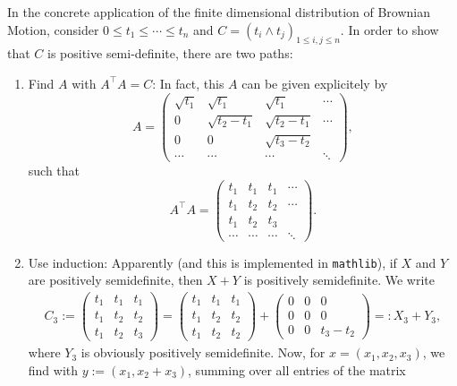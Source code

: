 \documentclass{article}
\theoremstyle{definition}
\theoremstyle{step} \newtheorem{step}{Step}
\newcommand{\leanline}[1]{\texttt{#1}}%
\begin{document}
In the concrete application of the finite dimensional distribution of
Brownian Motion, consider $0\leq t_1 \leq \cdots \leq t_n$ and $C =
(t_i \wedge t_j)_{1\leq i,j\leq n}$. In order to show that $C$ is
positive semi-definite, there are two paths:

\begin{enumerate}
\item Find $A$ with $A^\top A = C$: In fact, this $A$ can be given
  explicitely by
  $$ A = \left( \begin{matrix}\sqrt{t_1} & \sqrt{t_1} & \sqrt{t_1} &
    \cdots \\ 0 & \sqrt{t_2 - t_1} & \sqrt{t_2 - t_1} & \cdots \\ 0 &
    0 & \sqrt{t_3-t_2}\\ \cdots & \cdots & \cdots &
    \ddots \end{matrix}\right),$$ such that
  $$ A^\top A = \left( \begin{matrix} t_1 & t_1 & t_1 & \cdots \\ t_1
    & t_2 & t_2 & \cdots \\ t_1 & t_2 & t_3\\ \cdots & \cdots & \cdots
    & \ddots\end{matrix}\right).$$
\item Use induction: Apparently (and this is implemented in
  \leanline{mathlib}), if $X$ and $Y$ are positively semidefinite,
  then $X+Y$ is positively semidefinite. We write
  \begin{align*}
    C_3 := \left( \begin{matrix} t_1 & t_1 & t_1 \\ t_1 & t_2 & t_2 \\ t_1
      & t_2 & t_3\end{matrix}\right) = \left( \begin{matrix} t_1 & t_1 &
        t_1 \\ t_1 & t_2 & t_2 \\ t_1 & t_2 & t_2\end{matrix}\right) +
        \left( \begin{matrix} 0 & 0 & 0 \\ 0 & 0 & 0 \\ 0 & 0 & t_3 -
          t_2\end{matrix}\right) =: X_3 + Y_3,
  \end{align*}
  where $Y_3$ is obviously positively semidefinite. Now, for $x =
  (x_1, x_2, x_3)$, we find with $y := (x_1, x_2 + x_3)$, summing over
  all entries of the matrix
  \begin{align*}

\end{align*}
\end{enumerate}
\end{document}
